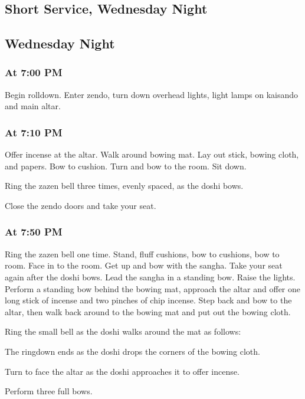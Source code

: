 \documentclass{kdo}
\begin{document}
\begin{services}
\part{Short Service, Wednesday Night}
\chapter{Wednesday Night}
\section*{At 7:00 PM}
\tenken Begin rolldown.
\doan Enter zendo, turn down overhead lights, light lamps on kaisando and main
altar.
\section*{At 7:10 PM}

\doshi Offer incense at the altar. Walk around bowing mat. Lay out stick,
bowing cloth, and papers. Bow to cushion. Turn and bow to the room. Sit down.

\doan Ring the zazen bell three times, evenly spaced, as the doshi bows.
\jundoStartZazen

\tenken Close the zendo doors and take your seat.

\section*{At 7:50 PM}
\doan Ring the zazen bell one time. \bigspace\zazenbell
\sangha Stand, fluff cushions, bow to cushions, bow to room. Face in to the
room.
\doan Get up and bow with the sangha. Take your seat again after the doshi
bows.
\doshi Lead the sangha in a standing bow.
\tenken Raise the lights.
\doshi Perform a standing bow behind the bowing mat, approach the altar and
offer one long stick of incense and two pinches of chip incense. Step back and
bow to the altar, then walk back around to the bowing mat and put out the
bowing cloth.

\pagebreak

\doan Ring the small bell as the doshi walks around the mat as follows:

\doshiBowingClothRolldown

The ringdown ends as the doshi drops the corners of the bowing cloth.

\kokyo Turn to face the altar as the doshi approaches it to offer incense.

\doshi Perform three full bows.


\end{services}
\end{document}
